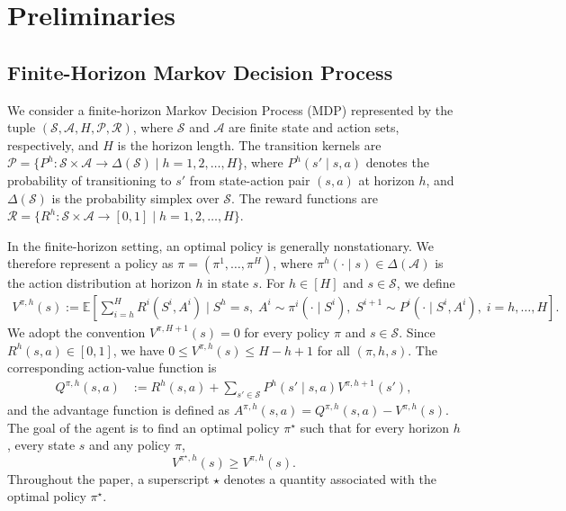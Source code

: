 \documentclass[11pt]{article}
\begin{document}
\section{Preliminaries}\label{sec:prelim}

\subsection{Finite-Horizon Markov Decision Process}
We consider a finite-horizon Markov Decision Process (MDP) represented by the tuple
$(\mathcal{S},\mathcal{A},H,\mathcal{P},\mathcal{R})$, where $\mathcal{S}$ and $\mathcal{A}$
are finite state and action sets, respectively, and $H$ is the horizon length. The transition kernels are
$\mathcal{P}=\{P^h:\mathcal{S} \times \mathcal{A} \to \Delta({\mathcal{S}}) \mid h=1,2,\dots,H \}$, where $P^h(s'\mid s,a)$ denotes the probability of transitioning to $s'$ from
state-action pair $(s,a)$ at horizon $h$, and $\Delta(\mathcal{S})$ is the
probability simplex over $\mathcal{S}$. The reward
functions are $\mathcal{R}=\{R^h: \mathcal{S} \times \mathcal{A} \to [0,1] \mid h=1,2,\dots,H\}$. 

In the finite-horizon setting, an optimal policy is generally nonstationary. We therefore
represent a policy as $\pi=(\pi^1,\ldots,\pi^H)$, where
$\pi^h(\cdot\mid s)\in\Delta(\mathcal{A})$ is the action distribution at
horizon $h$ in state $s$. For $h\in[H]$ and $s\in\mathcal{S}$, we define
\begin{align*}
V^{\pi,h}(s)
:=
\mathbb{E}\!\left[
\sum_{i=h}^{H}R^i(S^i,A^i)
\mid
S^h=s,\;
A^i\sim\pi^i(\cdot\mid S^i),\;
S^{i+1}\sim P^i(\cdot\mid S^i,A^i),\;
i=h,\ldots,H
\right].
\end{align*}
We adopt the convention $V^{\pi,H+1}(s)=0$ for every policy $\pi$ and
$s\in\mathcal{S}$. Since $R^h(s,a)\in[0,1]$,  we have
$0\le V^{\pi,h}(s)\le H-h+1$ for all $(\pi,h,s)$. The corresponding action-value function is
\begin{align*}
Q^{\pi,h}(s,a)
&:=
R^h(s,a)
+
\sum_{s'\in\mathcal{S}}
P^h(s'\mid s,a)V^{\pi,h+1}(s'),
\end{align*}
and the advantage function is defined as $A^{\pi,h}(s, a) = Q^{\pi,h} (s,a) -V^{\pi,h} (s)$.
The goal of the agent is to find an optimal policy $\pi^\star$ such that for every horizon $h$, every state $s$ and any policy $\pi$,
\begin{equation} \nonumber
V^{\pi^\star,h}(s) \geq  V^{\pi,h} (s).
\end{equation}
Throughout the paper, a superscript $\star$ denotes a quantity associated with the optimal policy $\pi^\star$.
\end{document}
